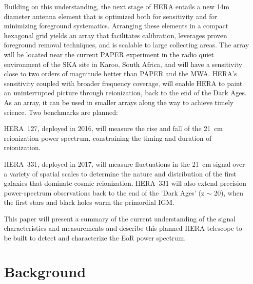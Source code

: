 \documentclass[ars]{/Users/daviddeboer1/Documents/Papers/Copernicus_LaTeX_Package_v_2_7/copernicus}
\begin{document}
Building on this understanding, the next stage of HERA entails a new
14m diameter antenna element that is optimized both for sensitivity
and for minimizing foreground systematics.  Arranging these elements
in a compact hexagonal grid yields an array that facilitates
calibration, leverages proven foreground removal techniques, and is
scalable to large collecting areas. The array will be located near the current PAPER
experiment
in the radio quiet environment of the SKA site in Karoo, South Africa,
and will have a sensitivity close to two orders of magnitude better than
PAPER and the MWA.  HERA's sensitivity coupled with broader frequency coverage, 
will enable HERA to paint an
uninterrupted picture through reionization, back to the end of the
Dark Ages.  As an array, it can be used in smaller arrays along the way to 
achieve timely science.  Two benchmarks are planned:

HERA~127, deployed in 2016, will measure the rise and fall of the
21~cm reionization power spectrum, constraining the timing and
duration of reionization.

HERA~331, deployed in 2017, will measure fluctuations in the 21~cm
signal over a variety of spatial scales to determine the nature and
distribution of the first galaxies that dominate cosmic
reionization. HERA~331 will also extend precision power-spectrum
observations back to the end of the 'Dark Ages' (z $\sim$ 20), when
the first stars and black holes warm the primordial IGM.

This paper will present a summary of the current understanding
of the signal characteristics and measurements and describe this planned
HERA telescope to be built to detect and characterize the EoR power
spectrum.

\section{Background}
\label{sec:background}
\end{document}
